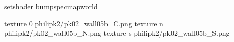 setshader bumpspecmapworld

texture 0 philipk2/pk02_wall05b_C.png
texture n philipk2/pk02_wall05b_N.png
texture s philipk2/pk02_wall05b_S.png

